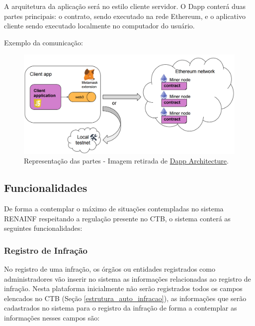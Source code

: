 A arquitetura da aplicação será no estilo cliente servidor. O Dapp conterá duas partes principais: o contrato, sendo executado na rede Ethereum, e o aplicativo cliente sendo executado localmente no computador do usuário.

Exemplo da comunicação:

    \begin{figure}[h]
         \centering
         \includegraphics[scale=0.25]{figuras/capitulo_3/dapp_representacao_comunicacao.png}
         \caption{Representação das partes - Imagem retirada de \href{https://sites.google.com/site/blockchaintutorial/dapp-architecture}{Dapp Architecture}.}
         \label{fig:dapp_representacao}
    \end{figure}



\subsection{Funcionalidades}

De forma a contemplar o máximo de situações contempladas no sistema RENAINF respeitando a regulação presente no CTB, o sistema conterá as seguintes funcionalidades:


    \subsubsection{Registro de Infração}
    
        No registro de uma infração, os órgãos ou entidades registrados como administradores vão inserir no sistema as informações relacionadas ao registro de infração. Nesta plataforma inicialmente não serão registrados todos os campos elencados no CTB (Seção \ref{estrutura_auto_infracao}), as informações que serão cadastrados no sistema para o registro da infração de forma a contemplar as informações nesses campos são:
        
